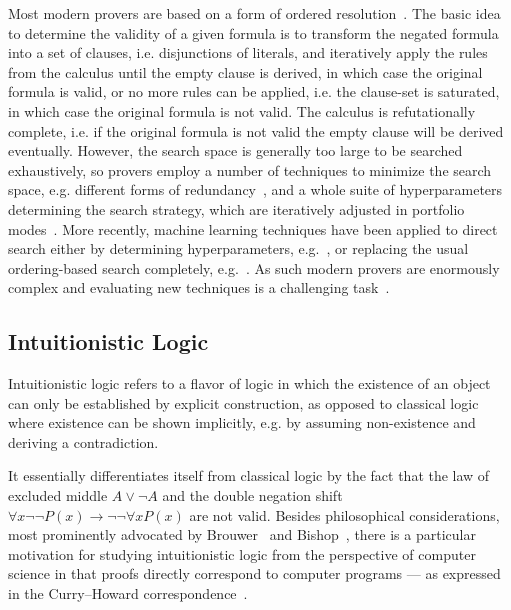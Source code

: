 \documentclass{article}
\theoremstyle{definition}
\theoremstyle{definition}
\theoremstyle{definition}
\theoremstyle{definition}
\theoremstyle{definition}
\theoremstyle{definition}
\theoremstyle{definition}
\newcommand{\0}{\mathbf 0}
\newcommand{\1}{\mathbf 1}
\begin{document}
	Most modern provers are based on a form of ordered resolution~\cite{bachmair2001resolution}. The basic idea to determine the validity of a given formula is to transform the negated formula into a set of clauses, i.e. disjunctions of literals, and iteratively apply the rules from the calculus until the empty clause is derived, in which case the original formula is valid, or no more rules can be applied, i.e. the clause-set is saturated, in which case the original formula is not valid. The calculus is refutationally complete, i.e. if the original formula is not valid the empty clause will be derived eventually. However, the search space is generally too large to be searched exhaustively, so provers employ a number of techniques to minimize the search space, e.g. different forms of redundancy~\cite{bachmair1994rewrite, hillenbrand2013search, gleiss2020subsumption}, and a whole suite of hyperparameters determining the search strategy, which are iteratively adjusted in portfolio modes~\cite{rawson2018dynamic}. More recently, machine learning techniques have been applied to direct search either by determining hyperparameters, e.g.~\cite{bartek2020learning,bartek2023much}, or replacing the usual ordering-based search completely, e.g.~\cite{jakubuuv2017enigma,kaliszyk2018reinforcement,crouse2021deep}. As such modern provers are enormously complex and evaluating new techniques is a challenging task~\cite{reger2014challenges}.


	\subsection{Intuitionistic Logic}

	Intuitionistic logic refers to a flavor of logic in which the existence of an object can only be established by explicit construction, as opposed to classical logic where existence can be shown implicitly, e.g. by assuming non-existence and deriving a contradiction.

	It essentially differentiates itself from classical logic by the fact that the law of excluded middle $A\vee\neg A$ and the double negation shift $\forall x\neg\neg P(x)\to\neg\neg\forall xP(x)$ are not valid.
	Besides philosophical considerations, most prominently advocated by Brouwer~\cite{brouwer1907over} and Bishop~\cite{bishop1967foundations}, there is a particular motivation for studying intuitionistic logic from the perspective of computer science in that proofs directly correspond to computer programs --- as expressed in the Curry--Howard correspondence~\cite{howard1980formulae}.
	
\end{document}
